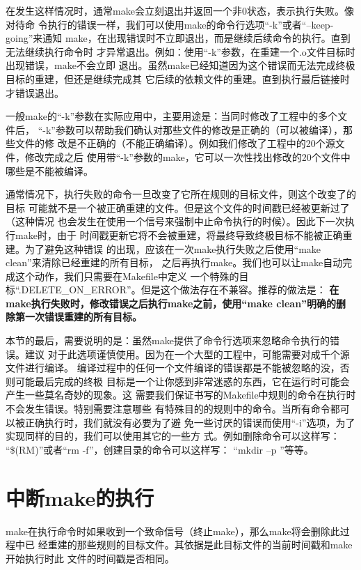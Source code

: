 在发生这样情况时，通常make会立刻退出并返回一个非0状态，表示执行失败。像对待命
令执行的错误一样，我们可以使用make的命令行选项“-k”或者“--keep-going”来通知
make，在出现错误时不立即退出，而是继续后续命令的执行。直到无法继续执行命令时
才异常退出。例如：使用“-k”参数，在重建一个.o文件目标时出现错误，make不会立即
退出。虽然make已经知道因为这个错误而无法完成终极目标的重建，但还是继续完成其
它后续的依赖文件的重建。直到执行最后链接时才错误退出。

一般make的“-k”参数在实际应用中，主要用途是：当同时修改了工程中的多个文件后，
“-k”参数可以帮助我们确认对那些文件的修改是正确的（可以被编译），那些文件的修
改是不正确的（不能正确编译）。例如我们修改了工程中的20个源文件，修改完成之后
使用带“-k”参数的make，它可以一次性找出修改的20个文件中哪些是不能被编译。

通常情况下，执行失败的命令一旦改变了它所在规则的目标文件，则这个改变了的目标
可能就不是一个被正确重建的文件。但是这个文件的时间戳已经被更新过了（这种情况
也会发生在使用一个信号来强制中止命令执行的时候）。因此下一次执行make时，由于
时间戳更新它将不会被重建，将最终导致终极目标不能被正确重建。为了避免这种错误
的出现，应该在一次make执行失败之后使用“make clean”来清除已经重建的所有目标，
之后再执行make。我们也可以让make自动完成这个动作，我们只需要在Makefile中定义
一个特殊的目标“.DELETE\_ON\_ERROR”。但是这个做法存在不兼容。推荐的做法是：
\textbf{在make执行失败时，修改错误之后执行make之前，使用“make clean”明确的删
除第一次错误重建的所有目标。}

本节的最后，需要说明的是：虽然make提供了命令行选项来忽略命令执行的错误。建议
对于此选项谨慎使用。因为在一个大型的工程中，可能需要对成千个源文件进行编译。
编译过程中的任何一个文件编译的错误都是不能被忽略的没，否则可能最后完成的终极
目标是一个让你感到非常迷惑的东西，它在运行时可能会产生一些莫名奇妙的现象。这
需要我们保证书写的Makefile中规则的命令在执行时不会发生错误。特别需要注意哪些
有特殊目的的规则中的命令。当所有命令都可以被正确执行时，我们就没有必要为了避
免一些讨厌的错误而使用“-i”选项，为了实现同样的目的，我们可以使用其它的一些方
式。例如删除命令可以这样写： “\$(RM)”或者“rm -f”，创建目录的命令可以这样写：
“mkdir –p ”等等。

\section{中断make的执行}

make在执行命令时如果收到一个致命信号（终止make），那么make将会删除此过程中已%
经重建的那些规则的目标文件。其依据是此目标文件的当前时间戳和make开始执行时此%
文件的时间戳是否相同。%


